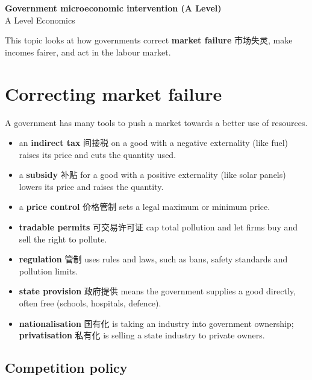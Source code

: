 \documentclass[11pt]{article}
\begin{document}
\begin{center}
  {\LARGE\bfseries Government microeconomic intervention (A Level)}\\[0.35em]
  {\large A Level Economics}
\end{center}
\vspace{0.6em}

This topic looks at how governments correct \textbf{market failure} 市场失灵, make incomes fairer, and act in the labour market.

\section*{Correcting market failure}

A government has many tools to push a market towards a better use of resources.

\begin{itemize}
\item an \textbf{indirect tax} 间接税 on a good with a negative externality (like fuel) raises its price and cuts the quantity used.

\item a \textbf{subsidy} 补贴 for a good with a positive externality (like solar panels) lowers its price and raises the quantity.

\item a \textbf{price control} 价格管制 sets a legal maximum or minimum price.

\item \textbf{tradable permits} 可交易许可证 cap total pollution and let firms buy and sell the right to pollute.

\item \textbf{regulation} 管制 uses rules and laws, such as bans, safety standards and pollution limits.

\item \textbf{state provision} 政府提供 means the government supplies a good directly, often free (schools, hospitals, defence).

\item \textbf{nationalisation} 国有化 is taking an industry into government ownership; \textbf{privatisation} 私有化 is selling a state industry to private owners.

\end{itemize}

\subsection*{Competition policy}
\end{document}
